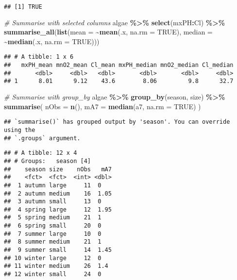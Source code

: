 \documentclass[
]{article}
\newenvironment{Shaded}{\begin{snugshade}}{\end{snugshade}}
\newcommand{\AttributeTok}[1]{\textcolor[rgb]{0.13,0.29,0.53}{#1}}
\newcommand{\CommentTok}[1]{\textcolor[rgb]{0.56,0.35,0.01}{\textit{#1}}}
\newcommand{\ConstantTok}[1]{\textcolor[rgb]{0.56,0.35,0.01}{#1}}
\newcommand{\FunctionTok}[1]{\textcolor[rgb]{0.13,0.29,0.53}{\textbf{#1}}}
\newcommand{\NormalTok}[1]{#1}
\newcommand{\SpecialCharTok}[1]{\textcolor[rgb]{0.81,0.36,0.00}{\textbf{#1}}}
\begin{document}
\begin{verbatim}
## [1] TRUE
\end{verbatim}

\begin{Shaded}
\begin{Highlighting}[]
\CommentTok{\# Summarise with selected columns}
\NormalTok{algae }\SpecialCharTok{\%\textgreater{}\%}
   \FunctionTok{select}\NormalTok{(mxPH}\SpecialCharTok{:}\NormalTok{Cl) }\SpecialCharTok{\%\textgreater{}\%}
   \FunctionTok{summarise\_all}\NormalTok{(}\FunctionTok{list}\NormalTok{(}\AttributeTok{mean =} \SpecialCharTok{\textasciitilde{}}\FunctionTok{mean}\NormalTok{(.x, }\AttributeTok{na.rm =} \ConstantTok{TRUE}\NormalTok{), }
                      \AttributeTok{median =} \SpecialCharTok{\textasciitilde{}}\FunctionTok{median}\NormalTok{(.x, }\AttributeTok{na.rm =} \ConstantTok{TRUE}\NormalTok{)))}
\end{Highlighting}
\end{Shaded}

\begin{verbatim}
## # A tibble: 1 x 6
##   mxPH_mean mnO2_mean Cl_mean mxPH_median mnO2_median Cl_median
##       <dbl>     <dbl>   <dbl>       <dbl>       <dbl>     <dbl>
## 1      8.01      9.12    43.6        8.06         9.8      32.7
\end{verbatim}

\begin{Shaded}
\begin{Highlighting}[]
\CommentTok{\# Summarise with group\_by}
\NormalTok{algae }\SpecialCharTok{\%\textgreater{}\%}
  \FunctionTok{group\_by}\NormalTok{(season, size) }\SpecialCharTok{\%\textgreater{}\%}
  \FunctionTok{summarise}\NormalTok{(}
    \AttributeTok{nObs =} \FunctionTok{n}\NormalTok{(),}
    \AttributeTok{mA7 =} \FunctionTok{median}\NormalTok{(a7, }\AttributeTok{na.rm =} \ConstantTok{TRUE}\NormalTok{)}
\NormalTok{  )}
\end{Highlighting}
\end{Shaded}

\begin{verbatim}
## `summarise()` has grouped output by 'season'. You can override using the
## `.groups` argument.
\end{verbatim}

\begin{verbatim}
## # A tibble: 12 x 4
## # Groups:   season [4]
##    season size    nObs   mA7
##    <fct>  <fct>  <int> <dbl>
##  1 autumn large     11  0   
##  2 autumn medium    16  1.05
##  3 autumn small     13  0   
##  4 spring large     12  1.95
##  5 spring medium    21  1   
##  6 spring small     20  0   
##  7 summer large     10  0   
##  8 summer medium    21  1   
##  9 summer small     14  1.45
## 10 winter large     12  0   
## 11 winter medium    26  1.4 
## 12 winter small     24  0
\end{verbatim}
\end{document}
